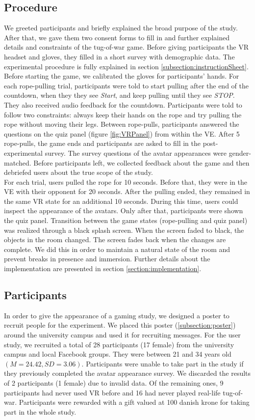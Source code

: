 \subsection{Procedure}
We greeted participants and briefly explained the broad purpose of the study. After that, we gave them two consent forms to fill in and further explained details and constraints of the tug-of-war game. Before giving participants the VR headset and gloves, they filled in a short survey with demographic data. The experimental procedure is fully explained in section \ref{subsection:instructionSheet}.
\\
Before starting the game, we calibrated the gloves for participants' hands. For each rope-pulling trial, participants were told to start pulling after the end of the countdown, when they they see \textit{Start}, and keep pulling until they see \textit{STOP}. They also received audio feedback for the countdown. Participants were told to follow two constraints: always keep their hands on the rope and try pulling the rope without moving their legs. Between rope-pulls, participants answered the questions on the quiz panel (figure \ref{fig:VRPanel}) from within the VE. After 5 rope-pulls, the game ends and participants are asked to fill in the post-experimental survey. The survey questions of the avatar appearances were gender-matched. Before participants left, we collected feedback about the game and then debriefed users about the true scope of the study.\\
For each trial, users pulled the rope for 10 seconds. Before that, they were in the VE with their opponent for 20 seconds. After the pulling ended, they remained in the same VR state for an additional 10 seconds. During this time, users could inspect the appearance of the avatars. Only after that, participants were shown the quiz panel. Transition between the game states (rope-pulling and quiz panel) was realized through a black splash screen. When the screen faded to black, the objects in the room changed. The screen fades back when the changes are complete. We did this in order to maintain a natural state of the room and prevent breaks in presence and immersion. Further details about the implementation are presented in section \ref{section:implementation}.\\
\subsection{Participants}
\label{subsection:participantsExperiment}
In order to give the appearance of a gaming study, we designed a poster to recruit people for the experiment. We placed this poster (\ref{subsection:poster}) around the university campus and  used it for recruiting messages. For the user study, we recruited a total of 28 participants (17 female) from the university campus and local Facebook groups. They were between 21 and 34 years old $(M = 24.42, SD = 3.06)$. Participants were unable to take part in the study if they previously completed the avatar appearance survey. We discarded the results of 2 participants (1 female) due to invalid data. Of the remaining ones, 9 participants had never used VR before and 16 had never played real-life tug-of-war. Participants were rewarded with a gift valued at 100 danish krone for taking part in the whole study.
